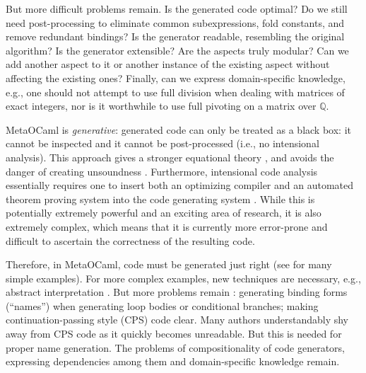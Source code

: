 \documentclass[draft]{elsart}
\begin{document}
But more difficult problems remain. Is the generated code optimal? Do
we still need post-processing to eliminate common subexpressions,
fold constants, and remove redundant bindings? Is the generator readable,
resembling the original algorithm? Is the generator extensible? Are the aspects
truly modular? Can we add another aspect to it or another instance of
the existing aspect without affecting the existing ones? Finally, can
we express domain-specific knowledge, e.g., one should not attempt to
use full division when dealing with matrices of exact integers, nor is
it worthwhile to use full pivoting on a matrix over $\mathbb Q$.

MetaOCaml is \emph{generative}: generated code can only be treated as
a black box: it cannot be inspected and it cannot be post-processed
(i.e., no intensional analysis). This approach gives a stronger
equational theory \cite{Taha2000}, and avoids the danger of creating
unsoundness \cite{TahaThesis}. Furthermore, intensional code analysis
essentially requires one to insert both an optimizing compiler and an
automated theorem proving system into the code generating system
\cite{Pueschel:05,Kennedy01Telescoping,dongarra7,Veldhuizen:2004}.
While this is potentially extremely powerful and an exciting area of
research, it is also extremely complex, which means that it is
currently more error-prone and difficult to ascertain the correctness
of the resulting code.

Therefore, in MetaOCaml, code must be generated just right (see
\cite{TahaThesis} for many simple examples).  For more complex
examples, new techniques are necessary, e.g., abstract interpretation
\cite{KiselyovTaha}.  But more problems remain
\cite{Padua:MetaOcaml:04}: generating binding forms (``names'')
when generating loop bodies or conditional branches; making
continuation-passing style (CPS) code clear.  Many authors
understandably shy away from CPS code as it quickly becomes
unreadable.  But this is needed for proper name generation.
The problems of compositionality of code generators, expressing
dependencies among them and domain-specific knowledge remain.
\end{document}
